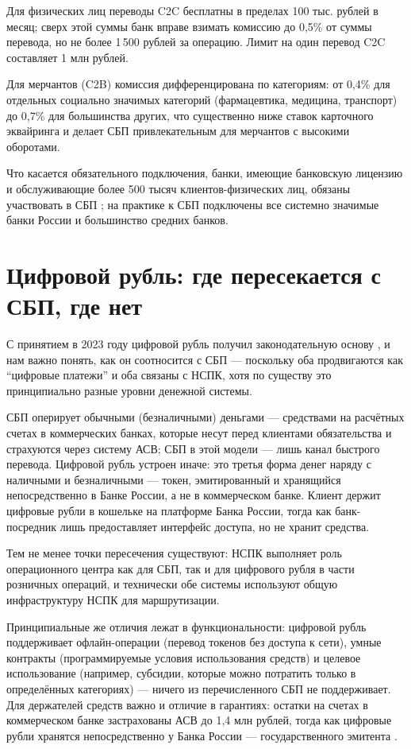 Для физических лиц переводы C2C бесплатны в пределах 100 тыс. рублей
в месяц; сверх этой суммы банк вправе взимать комиссию до 0,5\%
от суммы перевода, но не более 1\,500 рублей за операцию. Лимит на один
перевод C2C составляет 1 млн рублей.

Для мерчантов (C2B) комиссия дифференцирована по категориям:
от 0,4\% для отдельных социально значимых категорий (фармацевтика,
медицина, транспорт) до 0,7\% для большинства других, что существенно
ниже ставок карточного эквайринга и делает СБП привлекательным
для мерчантов с высокими оборотами.

Что касается обязательного подключения, банки, имеющие банковскую
лицензию и обслуживающие более 500 тысяч клиентов-физических лиц,
обязаны участвовать в СБП ; на практике
к СБП подключены все системно значимые банки России и большинство
средних банков.

\section{Цифровой рубль: где пересекается с СБП, где нет}
\label{sec:sbp-cbdc}

С принятием  в 2023 году цифровой рубль получил
законодательную основу , и нам важно понять, как он
соотносится с СБП — поскольку оба продвигаются как \enquote{цифровые
  платежи} и оба связаны с НСПК, хотя по существу это принципиально
разные уровни денежной системы.

СБП оперирует обычными (безналичными) деньгами — средствами
на расчётных счетах в коммерческих банках, которые несут перед клиентами
обязательства и страхуются через систему АСВ; СБП в этой модели —
лишь канал быстрого перевода. Цифровой рубль устроен иначе: это третья
форма денег наряду с наличными и безналичными — токен, эмитированный
и хранящийся непосредственно в Банке России, а не в коммерческом банке.
Клиент держит цифровые рубли в кошельке на платформе Банка России,
тогда как банк-посредник лишь предоставляет интерфейс доступа,
но не хранит средства.

Тем не менее точки пересечения существуют: НСПК выполняет роль
операционного центра как для СБП, так и для цифрового рубля в части
розничных операций, и технически обе системы используют общую
инфраструктуру НСПК для маршрутизации.

Принципиальные же отличия лежат в функциональности: цифровой рубль
поддерживает офлайн-операции (перевод токенов без доступа к сети),
умные контракты (программируемые условия использования средств)
и целевое использование (например, субсидии, которые можно потратить
только в определённых категориях) — ничего из перечисленного СБП
не поддерживает. Для держателей средств важно и отличие в гарантиях:
остатки на счетах в коммерческом банке застрахованы АСВ
до 1,4 млн рублей, тогда как цифровые рубли хранятся непосредственно
у Банка России — государственного эмитента .

